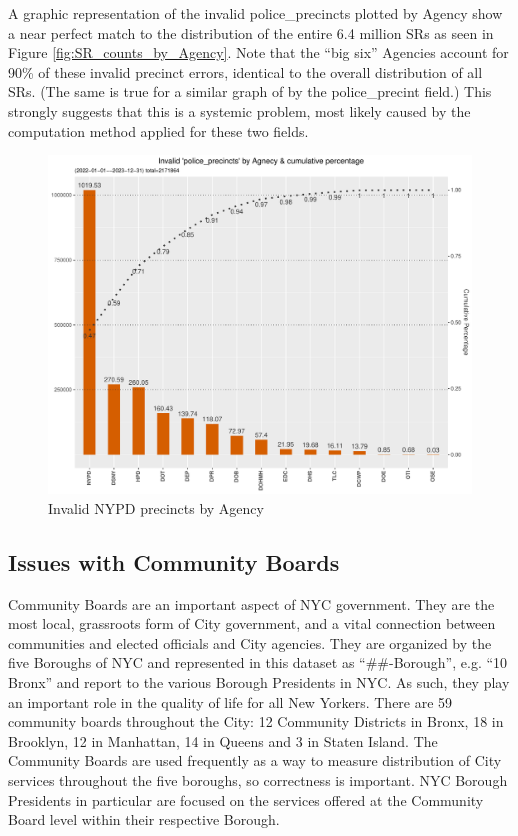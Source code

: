 \documentclass[12pt, titlepage]{article}
\begin{document}
	A graphic representation of the invalid police\_precincts plotted by 
	Agency show a near perfect match to the distribution of the entire 
	6.4 million SRs as seen in Figure \ref{fig:SR_counts_by_Agency}. Note 
	that the ``big six'' Agencies account for 90\% of these invalid precinct 
	errors, identical to the overall distribution of all SRs. (The same is true 
	for a similar graph of by the police\_precint field.) This strongly 
	suggests that this is a systemic problem, most likely caused by the 
	computation method applied for these two fields.
		 
	\begin{figure}[tbp]
		\centering
		\includegraphics[width=\textwidth]{invalid_police_precincts.pdf}
		\caption{Invalid NYPD precincts by Agency}	  
		\label{fig:invalid_police_precincts_zip}
	\end{figure}

\subsection{Issues with Community Boards}
\label{sec:communityboards}
	Community Boards are an important aspect of NYC government. They are the 
	most local, grassroots form of City government, and a vital connection 
	between communities and elected officials and City agencies. 
	They are organized by the five Boroughs of NYC and represented	
	in this dataset as ``\#\#-Borough'', e.g. ``10 Bronx'' and report to the 
	various Borough Presidents in NYC. As such, they play an important 
	role in the quality of life for all New Yorkers. There are 59 community 
	boards throughout the City: 12 Community Districts in Bronx, 18 in Brooklyn, 
	12 in Manhattan, 14 in Queens and 3 in Staten Island. The Community 
	Boards are used frequently as a way to measure distribution of 
	City services throughout the five boroughs, so correctness is important. 
	NYC Borough Presidents in particular are focused on the services 
	offered at the Community Board level within their respective Borough.
	
\end{document}
